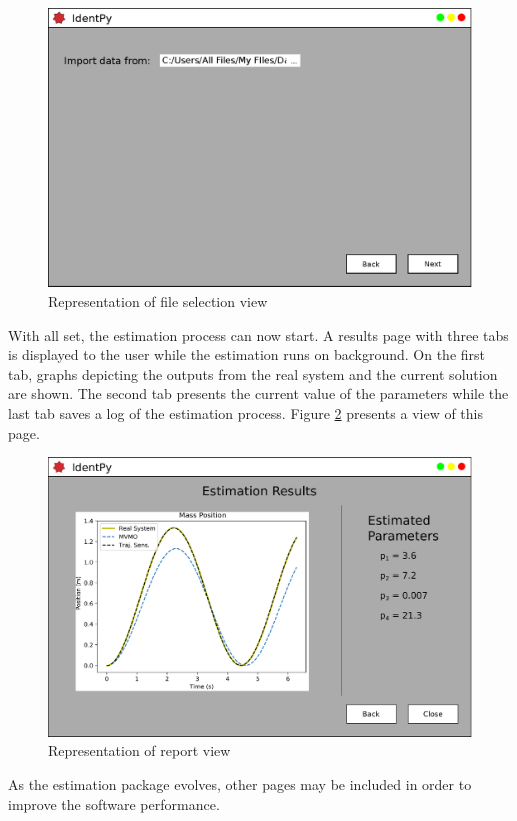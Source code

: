 \begin{figure}[h]
	\caption{Representation of file selection view}
	\begin{center}
		\includegraphics[scale=.5]{Images/Software_pg4.eps}
	\end{center}
	\label{fig: TS_page}
\end{figure}

With all set, the estimation process can now start. A results page with three tabs is displayed to the user while the estimation runs on background. On the first tab, graphs depicting the outputs from the real system and the current solution are shown. The second tab presents the current value of the parameters while the last tab saves a log of the estimation process. Figure \ref{fig: final_pg} presents a view of this page.

\begin{figure}[h]
	\caption{Representation of report view}
	\begin{center}
		\includegraphics[scale=.5]{Images/Software_final_pg.eps}
	\end{center}
	\label{fig: final_pg}
\end{figure}

As the estimation package evolves, other pages may be included in order to improve the software performance.